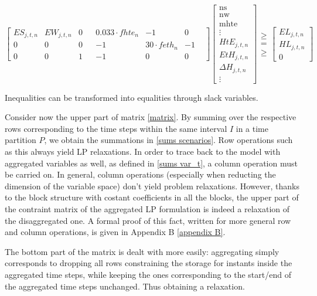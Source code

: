 \begin{equation}
\left[
\begin{array}{ccc|ccccc}
    ES_{j,t,n} & EW_{j,t,n} &0& & 0.033\cdot fhte_{n} & -1 & 0 & \\
    0          & 0          &0&  & -1  & 30\cdot feth_n & -1 & \\
    0          & 0          &1 &  & -1   & 0 & 0 &
\end{array}
\right]
  \begin{bmatrix}
    \text{ns}  \\
    \text{nw} \\
    \text{mhte} \\
    \hline
    \vdots \\
    HtE_{j,t,n} \\
    EtH_{j,t,n} \\
    \Delta H_{j,t,n}\\
    \vdots
  \end{bmatrix}
  \begin{matrix}
  \geq \\
  =\\
  \geq
  \end{matrix}
  \begin{bmatrix}
    EL_{j,t,n} \\
    HL_{j,t,n} \\
    0
  \end{bmatrix}
  \end{equation}  

Inequalities can be transformed into equalities through slack variables.

Consider now the upper part of matrix \ref{matrix}. 
By summing over the respective rows corresponding to the time steps within the same interval $I$ in a time partition $P$, we obtain the summations in \ref{sums scenarios}. 
Row operations such as this always yield LP relaxations. 
In order to trace back to the model with aggregated variables as well, as defined in \ref{sums var_t}, a column operation must be carried on. 
In general, column operations (especially when reducting the dimension of the variable space) don't yield problem relaxations. 
However, thanks to the block structure with costant coefficients in all the blocks, the upper part of the contraint matrix of the aggregated LP formulation is indeed a relaxation of the disaggregated one.  
A formal proof of this fact, written for more general row and column operations, is given in Appendix B \ref{appendix B}.

The bottom part of the matrix is dealt with more easily: aggregating simply corresponds to dropping all rows constraining the storage for instants inside the aggregated time steps, while keeping the ones corresponding to the start/end of the aggregated time steps unchanged.
Thus obtaining a relaxation.





